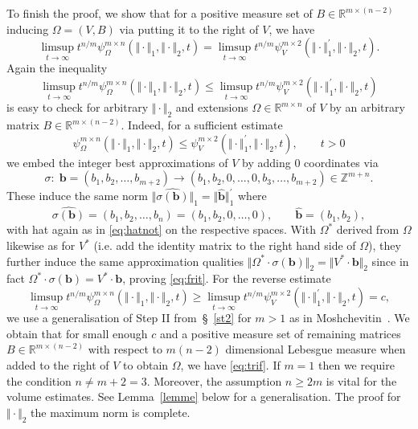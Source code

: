 \documentclass[10pt]{amsart}
\theoremstyle{definition}
\newcommand{\bb}{\boldsymbol{b}}
\newcommand{\R}{\mathbb{R}}
\newcommand{\Z}{\mathbb{Z}}
\begin{document}
To finish the proof, we show that for a positive measure set of $B\in \R^{m\times (n-2)}$ inducing $\Omega=(V,B)$ via putting it to the right of $V$,
we have
\[
\limsup_{t\to\infty} t^{n/m} \psi_{\Omega}^{m\times n}(\Vert\cdot\Vert_1, \Vert\cdot\Vert_2, t)=\limsup_{t\to\infty} t^{n/m} \psi_{V}^{m\times 2}(\Vert\cdot\Vert_1^{\prime}, \Vert\cdot\Vert_2, t).
\] 
Again the inequality
\begin{equation} \label{eq:frit}
\limsup_{t\to\infty} t^{n/m} \psi_{\Omega}^{m\times n}(\Vert\cdot\Vert_1, \Vert\cdot\Vert_2, t)\le \limsup_{t\to\infty} t^{n/m} \psi_{V}^{m\times 2}(\Vert\cdot\Vert_1^{\prime}, \Vert\cdot\Vert_2, t)
\end{equation}
is easy to check for arbitrary $\Vert\cdot\Vert_2$ and extensions $\Omega\in\R^{m\times n}$
of $V$ by an arbitrary matrix $B\in \R^{m\times (n-2)}$. Indeed, for a sufficient estimate
\[
\psi_{\Omega}^{m\times n}(\Vert\cdot\Vert_1, \Vert\cdot\Vert_2, t)\le \psi_{V}^{m\times 2}(\Vert\cdot\Vert_1^{\prime}, \Vert\cdot\Vert_2, t), \qquad t>0
\]
we embed the integer best approximations of $V$ 
by adding $0$ coordinates via
\[
\sigma:\;\bb=(b_1, b_2, \ldots, b_{m+2})\to (b_1,b_2,0,\ldots,0,b_3,\ldots,b_{m+2})\in\Z^{m+n}.
\]
These induce the same
norm $\Vert \widehat{\sigma(\bb)} \Vert_1=\Vert \widehat{\bb} \Vert_1^{\prime}$ 
where
\[
\widehat{\sigma(\bb)}= (b_1,b_2,\ldots,b_n)=(b_1,b_2,0,\ldots,0), \qquad \widehat{\bb}= (b_1,b_2),
\]
with hat again as in \eqref{eq:hatnot}
on the respective spaces. With $\Omega^{\ast}$ derived from $\Omega$ likewise as for $V^{\ast}$ (i.e. add the identity matrix to the right hand side of $\Omega$),
they further induce the same approximation qualities $\Vert \Omega^{\ast}\cdot \sigma(\bb) \Vert_2=\Vert V^{\ast}\cdot \bb \Vert_2$ since in fact 
$\Omega^{\ast}\cdot \sigma(\bb) =V^{\ast}\cdot \bb$, proving \eqref{eq:frit}.
For the reverse estimate
\begin{equation}  \label{eq:trif}
\limsup_{t\to\infty} t^{n/m} \psi_{\Omega}^{m\times n}(\Vert\cdot\Vert_1, \Vert\cdot\Vert_2, t)\ge \limsup_{t\to\infty} t^{n/m} \psi_{V}^{m\times 2}(\Vert\cdot\Vert_1^{\prime}, \Vert\cdot\Vert_2, t)=c,
\end{equation}
we use a generalisation of Step II from~\S~\ref{st2} for $m>1$ 
as in Moshchevitin~\cite[Theorem~12]{ngm}. We obtain that for small enough $c$ and a positive measure set of remaining matrices $B\in \R^{m\times (n-2)}$ with respect to $m(n-2)$ dimensional Lebesgue measure
when added to the right of $V$ to obtain $\Omega$, we have \eqref{eq:trif}.
If $m=1$ then 
we require the condition $n\ne m+2=3$.
Moreover, the assumption $n\ge 2m$ is vital for the volume estimates.
See Lemma~\ref{lemme} below for a generalisation. The proof for $\Vert\cdot\Vert_2$ the maximum 
norm is complete.
\end{document}
